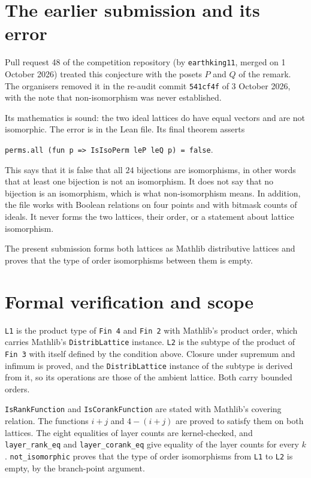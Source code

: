 \documentclass[11pt]{article}
\theoremstyle{remark}
\begin{document}
\section*{The earlier submission and its error}
Pull request 48 of the competition repository (by \texttt{earthking11},
merged on 1 October 2026) treated this conjecture with the posets $P$
and $Q$ of the remark. The organisers removed it in the re-audit commit
\texttt{541cf4f} of 3 October 2026, with the note that non-isomorphism
was never established.

Its mathematics is sound: the two ideal lattices do have equal vectors
and are not isomorphic. The error is in the Lean file. Its final theorem
asserts
\begin{center}\small
\texttt{perms.all (fun p => IsIsoPerm leP leQ p) = false}.
\end{center}
This says that it is false that all $24$ bijections are isomorphisms,
in other words that at least one bijection is not an isomorphism. It
does not say that no bijection is an isomorphism, which is what
non-isomorphism means. In addition, the file works with Boolean
relations on four points and with bitmask counts of ideals. It never
forms the two lattices, their order, or a statement about lattice
isomorphism.

The present submission forms both lattices as Mathlib distributive
lattices and proves that the type of order isomorphisms between them is
empty.

\section*{Formal verification and scope}
\texttt{L1} is the product type of \texttt{Fin 4} and \texttt{Fin 2}
with Mathlib's product order, which carries Mathlib's
\texttt{DistribLattice} instance. \texttt{L2} is the subtype of the
product of \texttt{Fin 3} with itself defined by the condition above. Closure under supremum and infimum is proved, and the
\texttt{DistribLattice} instance of the subtype is derived from it, so
its operations are those of the ambient lattice. Both carry bounded
orders.

\texttt{IsRankFunction} and \texttt{IsCorankFunction} are stated with
Mathlib's covering relation. The functions $i+j$ and $4-(i+j)$ are
proved to satisfy them on both lattices. The eight equalities of layer
counts are kernel-checked, and \texttt{layer\_rank\_eq} and
\texttt{layer\_corank\_eq} give equality of the layer counts for every
$k$. \texttt{not\_isomorphic} proves that the type of order isomorphisms
from \texttt{L1} to \texttt{L2} is empty, by the branch-point argument.
\end{document}
